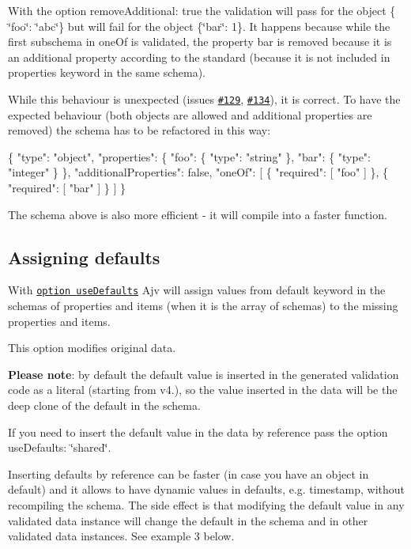 With the option {\ttfamily remove\+Additional\+: true} the validation will pass for the object {\ttfamily \{ \char`\"{}foo\char`\"{}\+: \char`\"{}abc\char`\"{}\}} but will fail for the object {\ttfamily \{\char`\"{}bar\char`\"{}\+: 1\}}. It happens because while the first subschema in {\ttfamily one\+Of} is validated, the property {\ttfamily bar} is removed because it is an additional property according to the standard (because it is not included in {\ttfamily properties} keyword in the same schema).

While this behaviour is unexpected (issues \href{https://github.com/epoberezkin/ajv/issues/129}{\tt \#129}, \href{https://github.com/epoberezkin/ajv/issues/134}{\tt \#134}), it is correct. To have the expected behaviour (both objects are allowed and additional properties are removed) the schema has to be refactored in this way\+:


\begin{DoxyCode}
\{
  "type": "object",
  "properties": \{
    "foo": \{ "type": "string" \},
    "bar": \{ "type": "integer" \}
  \},
  "additionalProperties": false,
  "oneOf": [
    \{ "required": [ "foo" ] \},
    \{ "required": [ "bar" ] \}
  ]
\}
\end{DoxyCode}


The schema above is also more efficient -\/ it will compile into a faster function.

\subsection*{Assigning defaults}

With \href{#options}{\tt option {\ttfamily use\+Defaults}} Ajv will assign values from {\ttfamily default} keyword in the schemas of {\ttfamily properties} and {\ttfamily items} (when it is the array of schemas) to the missing properties and items.

This option modifies original data.

{\bfseries Please note}\+: by default the default value is inserted in the generated validation code as a literal (starting from v4.), so the value inserted in the data will be the deep clone of the default in the schema.

If you need to insert the default value in the data by reference pass the option {\ttfamily use\+Defaults\+: \char`\"{}shared\char`\"{}}.

Inserting defaults by reference can be faster (in case you have an object in {\ttfamily default}) and it allows to have dynamic values in defaults, e.\+g. timestamp, without recompiling the schema. The side effect is that modifying the default value in any validated data instance will change the default in the schema and in other validated data instances. See example 3 below.

